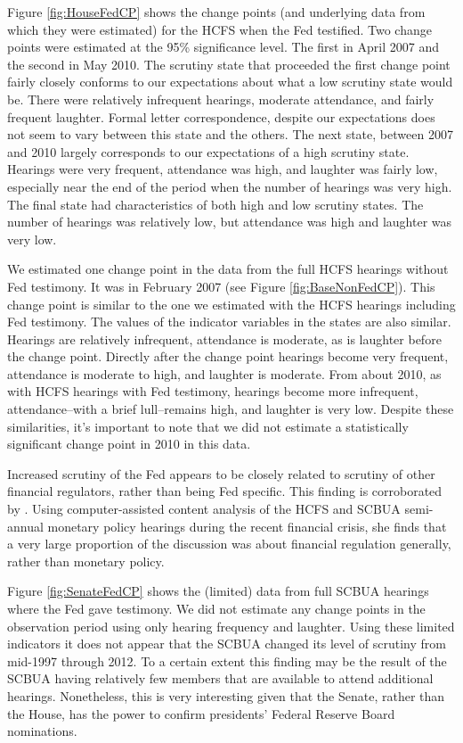 \documentclass[a4paper]{article}\usepackage[]{graphicx}\usepackage[]{color}
\begin{document}
Figure \ref{fig:HouseFedCP} shows the change points (and underlying data from which they were estimated) for the HCFS when the Fed testified. Two change points were estimated at the 95\% significance level. The first in April 2007 and the second in May 2010. The scrutiny state that proceeded the first change point fairly closely conforms to our expectations about what a low scrutiny state would be. There were relatively infrequent hearings, moderate attendance, and fairly frequent laughter. Formal letter correspondence, despite our expectations does not seem to vary between this state and the others. The next state, between 2007 and 2010 largely corresponds to our expectations of a high scrutiny state. Hearings were very frequent, attendance was high, and laughter was fairly low, especially near the end of the period when the number of hearings was very high. The final state had characteristics of both high and low scrutiny states. The number of hearings was relatively low, but attendance was high and laughter was very low.

We estimated one change point in the data from the full HCFS hearings without Fed testimony. It was in February 2007 (see Figure \ref{fig:BaseNonFedCP}). This change point is similar to the one we estimated with the HCFS hearings including Fed testimony. The values of the indicator variables in the states are also similar. Hearings are relatively infrequent, attendance is moderate, as is laughter before the change point. Directly after the change point hearings become very frequent, attendance is moderate to high, and laughter is moderate. From about 2010, as with HCFS hearings with Fed testimony, hearings become more infrequent, attendance--with a brief lull--remains high, and laughter is very low. Despite these similarities, it's important to note that we did not estimate a statistically significant change point in 2010 in this data.

Increased scrutiny of the Fed appears to be closely related to scrutiny of other financial regulators, rather than being Fed specific. This finding is corroborated by \cite{SchonhardtBailey2012}. Using computer-assisted content analysis of the HCFS and SCBUA semi-annual monetary policy hearings during the recent financial crisis, she finds that a very large proportion of the discussion was about financial regulation generally, rather than monetary policy.

Figure \ref{fig:SenateFedCP} shows the (limited) data from full SCBUA hearings where the Fed gave testimony. We did not estimate any change points in the observation period using only hearing frequency and laughter. Using these limited indicators it does not appear that the SCBUA changed its level of scrutiny from mid-1997 through 2012. To a certain extent this finding may be the result of the SCBUA having relatively few members that are available to attend additional hearings. Nonetheless, this is very interesting given that the Senate, rather than the House, has the power to confirm presidents' Federal Reserve Board nominations.
\end{document}
